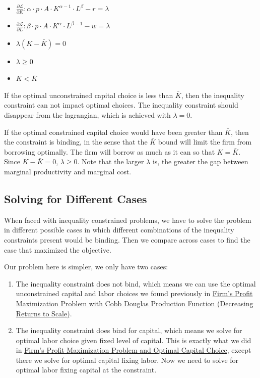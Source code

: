 \documentclass[
]{book}
\begin{document}
\begin{itemize}
\item
  \(\displaystyle \frac{\partial \mathcal{L}}{\partial K}:\alpha \cdot p\cdot A\cdot K^{\alpha -1} \cdot L^{\beta } -r=\lambda\)
\item
  \(\displaystyle \frac{\partial \mathcal{L}}{\partial L}:\beta \cdot p\cdot A\cdot K^{\alpha } \cdot L^{\beta -1} -w=\lambda\)
\item
  \(\displaystyle \lambda \left(K-\bar{K} \right)=0\)
\item
  \(\displaystyle \lambda \ge 0\)
\item
  \(\displaystyle K<\bar{K}\)
\end{itemize}

If the optimal unconstrained capital choice is less than \(\bar{K}\), then
the inequality constraint can not impact optimal choices. The inequality
constraint should disappear from the lagrangian, which is achieved with
\(\lambda =0\).

If the optimal constrained capital choice would have been greater than
\(\bar{K}\), then the constraint is binding, in the sense that the
\(\bar{K}\) bound will limit the firm from borrowing optimally. The firm
will borrow as much as it can so that \(K=\bar{K}\). Since \(K-\bar{K} =0\),
\(\lambda \ge 0\). Note that the larger \(\lambda\) is, the greater the gap
between marginal productivity and marginal cost.

\hypertarget{solving-for-different-cases}{%
\subsection{Solving for Different Cases}\label{solving-for-different-cases}}

When faced with inequality constrained problems, we have to solve the
problem in different possible cases in which different combinations of
the inequality constraints present would be binding. Then we compare
across cases to find the case that maximized the objective.

Our problem here is simpler, we only have two cases:

\begin{enumerate}
\def\labelenumi{\arabic{enumi}.}
\item
  The inequality constraint does not bind, which means we can use the
  optimal unconstrained capital and labor choices we found previously
  in \href{https://fanwangecon.github.io/Math4Econ/matrix_application/KL_borrowhire_firm.html}{Firm's Profit Maximization Problem with Cobb Douglas Production
  Function (Decreasing Returns to
  Scale)}.
\item
  The inequality constraint does bind for capital, which means we
  solve for optimal labor choice given fixed level of capital. This is
  exactly what we did in \href{https://fanwangecon.github.io/Math4Econ/derivative_application/K_borrow_firm.html}{Firm's Profit Maximization Problem and
  Optimal Capital
  Choice},
  except there we solve for optimal capital fixing labor. Now we need
  to solve for optimal labor fixing capital at the constraint.
\end{enumerate}
\end{document}
